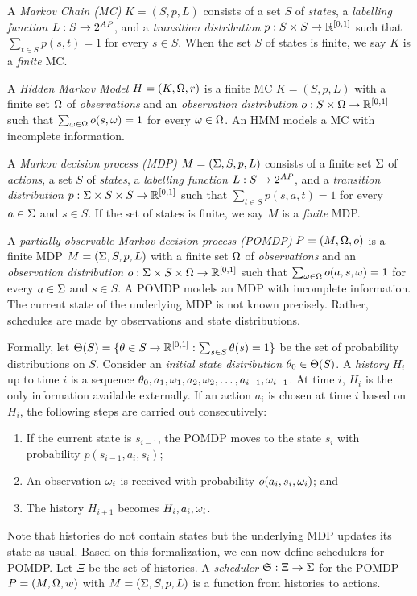 
A \emph{Markov Chain (MC)} $K = (S, p, L)$ consists of a set $S$ of
\emph{states}, a \emph{labelling function} $L : S \rightarrow
2^{\mathit{AP}}$, and a \emph{transition distribution} $p : S \times S
\rightarrow \mathbb{R}^{[0, 1]}$ such that $\sum_{t \in S} p (s, t) = 1$ for every
$s \in S$. When the set $S$ of states is finite, we say $K$ is a
\emph{finite} MC. 

A \emph{Hidden Markov Model} $H = (K, \Omega, r)$ is a finite MC $K =
(S, p, L)$ with a finite set $\Omega$ of \emph{observations} and an
\emph{observation distribution} $o : S \times \Omega \rightarrow \mathbb{R}^{[0, 1]}$
such that $\sum_{\omega \in \Omega} o (s, \omega) = 1$ for every $\omega \in
\Omega$. An HMM models a MC with incomplete information. 

A \emph{Markov decision process (MDP)} $M = (\Sigma, S, p, L)$ consists of
a finite set $\Sigma$ of \emph{actions}, a set $S$ of \emph{states}, a
\emph{labelling function} $L : S \rightarrow 2^{\mathit{AP}}$, and 
a \emph{transition distribution} $p : \Sigma \times S \times S
\rightarrow \mathbb{R}^{[0, 1]}$ such that $\sum_{t \in S} p (s, a, t) = 1$
for every $a \in \Sigma$ and $s \in S$. If the set of states is finite,
we say $M$ is a \emph{finite} MDP.

A \emph{partially observable Markov decision process (POMDP)} $P =
(M, \Omega, o)$ is a finite MDP $M = (\Sigma, S, p, L)$ with a finite set
$\Omega$ of \emph{observations} and an \emph{observation distribution} $o
: \Sigma  \times S \times \Omega \rightarrow \mathbb{R}^{[0, 1]}$ such that $\sum_{\omega
  \in \Omega} o (a, s, \omega) = 1$ for every $a \in \Sigma$ and $s \in S$.
A POMDP models an MDP with incomplete information. The current state
of the underlying MDP is not known precisely. Rather, schedules are
made by observations and state distributions. 

Formally, let $\Theta (S) = \{ \theta \in S \rightarrow \mathbb{R}^{[0, 1]} : \sum_{s \in
 S} \theta (s) = 1 \}$ be the set of probability distributions on $S$. 
Consider an \emph{initial state distribution} $\theta_0 \in \Theta (S)$. A
\emph{history} $H_i$ up to time $i$ is a sequence $\theta_0, a_1, \omega_1,
a_2, \omega_2, \ldots, a_{i-1}, \omega_{i-1}$. At time $i$, $H_i$ is the
only information available externally. If an action $a_i$ is chosen
at time $i$ based on $H_i$, the following steps are carried out
consecutively:
\begin{enumerate}
\item If the current state is $s_{i-1}$, the POMDP moves to the state
  $s_i$ with probability $p (s_{i-1}, a_i, s_i)$;
\item An observation $\omega_i$ is received with probability $o (a_i, s_i,
  \omega_i)$; and
\item The history $H_{i+1}$ becomes $H_i, a_i, \omega_i$.
\end{enumerate}
Note that histories do not contain states but the underlying MDP
updates its state as usual. Based on this formalization, we can now
define schedulers for POMDP. Let $\Xi$ be the set of histories. A
\emph{scheduler} $\mathfrak{S} : \Xi \rightarrow \Sigma$ for the POMDP $P
= (M, \Omega, w)$ with $M = (\Sigma, S, p, L)$ is a function
from histories to actions. 

